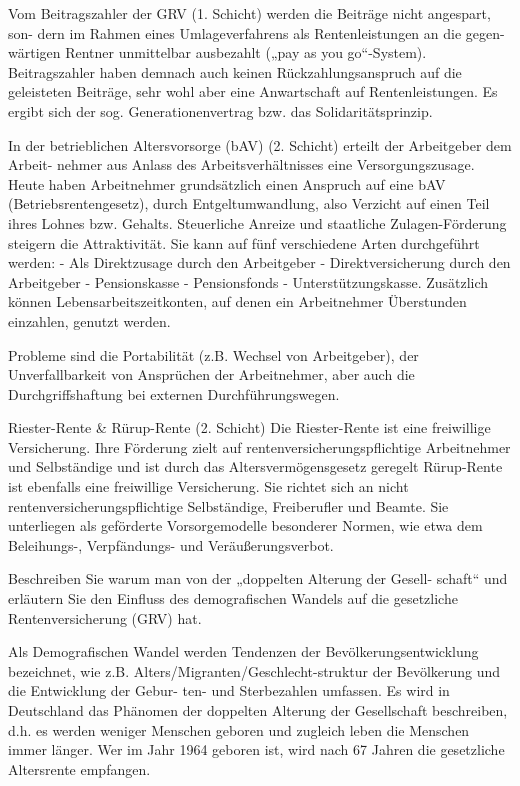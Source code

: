 Vom Beitragszahler der GRV (1. Schicht) werden die Beiträge nicht angespart, son-
dern im Rahmen eines Umlageverfahrens als Rentenleistungen an die gegen-
wärtigen Rentner unmittelbar ausbezahlt („pay as you go“-System). Beitragszahler 
haben demnach auch keinen Rückzahlungsanspruch auf die geleisteten Beiträge, 
sehr wohl aber eine Anwartschaft auf Rentenleistungen.
Es ergibt sich der sog. Generationenvertrag bzw. das Solidaritätsprinzip.

In der betrieblichen Altersvorsorge (bAV) (2. Schicht) erteilt der Arbeitgeber dem Arbeit-
nehmer aus Anlass des Arbeitsverhältnisses eine Versorgungszusage.
Heute haben Arbeitnehmer grundsätzlich einen Anspruch auf eine bAV (Betriebsrentengesetz),
durch Entgeltumwandlung, also Verzicht auf einen Teil ihres Lohnes bzw. Gehalts. 
Steuerliche Anreize und staatliche Zulagen-Förderung steigern die Attraktivität.
Sie kann auf fünf verschiedene Arten durchgeführt werden: 
- Als Direktzusage durch den Arbeitgeber 
- Direktversicherung durch den Arbeitgeber 
- Pensionskasse
- Pensionsfonds 
- Unterstützungskasse.
Zusätzlich können Lebensarbeitszeitkonten, auf denen ein Arbeitnehmer Überstunden einzahlen, genutzt werden.

Probleme sind die Portabilität (z.B. Wechsel von Arbeitgeber), der Unverfallbarkeit von Ansprüchen der Arbeitnehmer, 
aber auch die Durchgriffshaftung bei externen Durchführungswegen.

Riester-Rente \& Rürup-Rente (2. Schicht)
Die Riester-Rente ist eine freiwillige Versicherung. 
Ihre Förderung zielt auf rentenversicherungspflichtige Arbeitnehmer und
Selbständige und ist durch das Altersvermögensgesetz geregelt
Rürup-Rente ist ebenfalls eine freiwillige Versicherung. Sie richtet
sich an nicht rentenversicherungspflichtige Selbständige, Freiberufler und Beamte.
Sie unterliegen als geförderte Vorsorgemodelle besonderer Normen, wie etwa dem 
Beleihungs-, Verpfändungs- und Veräußerungsverbot.



Beschreiben Sie warum man von der „doppelten Alterung der Gesell-
schaft“ und erläutern Sie den Einfluss des demografischen Wandels auf
die gesetzliche Rentenversicherung (GRV) hat.

Als Demografischen Wandel werden Tendenzen der Bevölkerungsentwicklung
bezeichnet, wie z.B. Alters/Migranten/Geschlecht-struktur der Bevölkerung und die Entwicklung der Gebur-
ten- und Sterbezahlen umfassen.
Es wird in Deutschland das Phänomen der doppelten Alterung der Gesellschaft beschreiben, 
d.h. es werden weniger Menschen geboren und zugleich leben die Menschen immer länger.
Wer im Jahr 1964 geboren ist, wird nach 67 Jahren die gesetzliche Altersrente empfangen.


